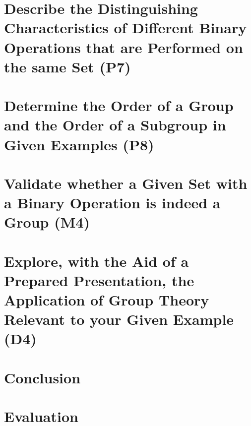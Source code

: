 \documentclass[12pt, a4paper, twoside]{report} %
\begin{document}
\section{Describe the Distinguishing Characteristics of Different Binary Operations that are Performed on the same Set (P7)}
\label{sec:P7}

\section{Determine the Order of a Group and the Order of a Subgroup in Given Examples (P8)}
\label{sec:P8}

\section{Validate whether a Given Set with a Binary Operation is indeed a Group (M4)}
\label{sec:M4}

\section{Explore, with the Aid of a Prepared Presentation, the Application of Group Theory Relevant to your Given Example (D4)}
\label{sec:D4}


\cite{doe2021}
\newpage
\section*{Conclusion}
\newpage
\section*{Evaluation}


\end{document}
